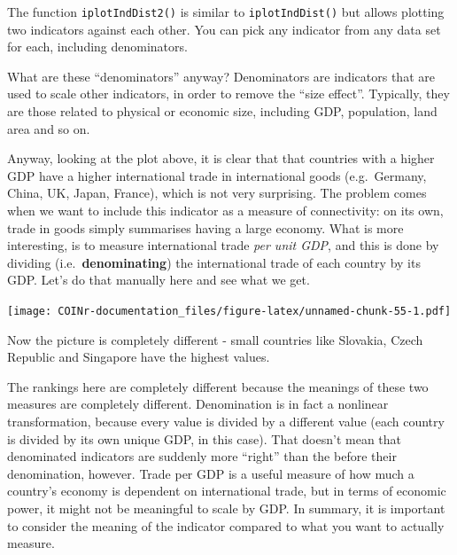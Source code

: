 \documentclass[
]{book}
\newenvironment{Shaded}{\begin{snugshade}}{\end{snugshade}}
\newcommand{\AttributeTok}[1]{\textcolor[rgb]{0.77,0.63,0.00}{#1}}
\newcommand{\CommentTok}[1]{\textcolor[rgb]{0.56,0.35,0.01}{\textit{#1}}}
\newcommand{\FunctionTok}[1]{\textcolor[rgb]{0.00,0.00,0.00}{#1}}
\newcommand{\NormalTok}[1]{#1}
\newcommand{\OtherTok}[1]{\textcolor[rgb]{0.56,0.35,0.01}{#1}}
\newcommand{\SpecialCharTok}[1]{\textcolor[rgb]{0.00,0.00,0.00}{#1}}
\begin{document}
The function \texttt{iplotIndDist2()} is similar to \texttt{iplotIndDist()} but allows plotting two indicators against each other. You can pick any indicator from any data set for each, including denominators.

What are these ``denominators'' anyway? Denominators are indicators that are used to scale other indicators, in order to remove the ``size effect''. Typically, they are those related to physical or economic size, including GDP, population, land area and so on.

Anyway, looking at the plot above, it is clear that that countries with a higher GDP have a higher international trade in international goods (e.g.~Germany, China, UK, Japan, France), which is not very surprising. The problem comes when we want to include this indicator as a measure of connectivity: on its own, trade in goods simply summarises having a large economy. What is more interesting, is to measure international trade \emph{per unit GDP}, and this is done by dividing (i.e.~\textbf{denominating}) the international trade of each country by its GDP. Let's do that manually here and see what we get.

\begin{Shaded}
\end{Shaded}

\texttt{[image: COINr-documentation\_files/figure-latex/unnamed-chunk-55-1.pdf]}

Now the picture is completely different - small countries like Slovakia, Czech Republic and Singapore have the highest values.

The rankings here are completely different because the meanings of these two measures are completely different. Denomination is in fact a nonlinear transformation, because every value is divided by a different value (each country is divided by its own unique GDP, in this case). That doesn't mean that denominated indicators are suddenly more ``right'' than the before their denomination, however. Trade per GDP is a useful measure of how much a country's economy is dependent on international trade, but in terms of economic power, it might not be meaningful to scale by GDP. In summary, it is important to consider the meaning of the indicator compared to what you want to actually measure.
\end{document}
